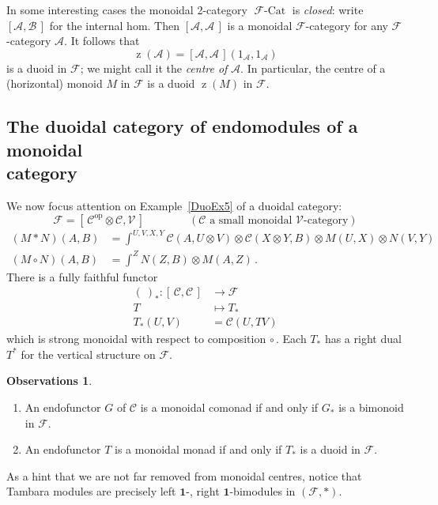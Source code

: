 \documentclass[a4paper,12pt]{article}
\theoremstyle{definition}
\newtheorem*{Observations}{Observations}%
\theoremstyle{fact}
\theoremstyle{genquest}
\theoremstyle{step}
\newcommand{\catI}{\mathbf{1}}
\newcommand{\catA}{\mathcal{A}}
\newcommand{\catB}{\mathcal{B}}
\newcommand{\catC}{\mathcal{C}}
\newcommand{\catF}{\mathcal{F}}
\newcommand{\FCat}{\operatorname{\mathcal{F}\mbox{-}Cat}}
\newcommand{\catV}{\mathcal{V}}
\newcommand{\op}{\operatorname{op}}
\newcommand{\zz}{\operatorname{z}}
\newcommand{\longto}{\longrightarrow}
\begin{document}
In some interesting cases the monoidal 2-category $\FCat$ is \emph{closed}: write $[\catA,\catB\,]$ for the internal hom.   
Then $[\catA,\catA\,]$ is a monoidal $\catF$-category for any $\catF$-category $\catA$.   
It follows that
\[
\zz(\catA) = [\catA,\catA\,] (1_\catA,1_\catA)
\]
is a duoid in $\catF$; we might call it the \emph{centre of} $\catA$.    
In particular, the centre of a (horizontal) monoid $M$ in $\catF$ is a duoid $\zz(M)$ in $\catF$. 


\subsection{The duoidal category of endomodules of a monoidal\\category}

We now focus attention on Example~\ref{DuoEx5} of a duoidal category:
\[
\catF = [\,\catC^{\op} \otimes \catC,\catV\,] \qquad \qquad (\catC \text{ a small monoidal } \catV\text{-category})
\]
\begin{align*}
 (M \ast N) (A,B) &= \int^{U,V,X,Y} \catC (A,U \otimes V) \otimes \catC (X \otimes Y,B) \otimes M (U,X) \otimes N (V,Y)
\\
 (M \circ N) (A,B) &= \int^Z N(Z,B) \otimes M (A,Z)\,.
\end{align*}
%
There is a fully faithful functor
\begin{align*}
(\ )_\ast : [\,\catC,\catC\,] &\longto \catF
\\T &\longmapsto  T_\ast
\\T_\ast (U,V) &= \catC (U,TV)
\end{align*}
which is strong monoidal with respect to composition $\circ\,$.   
Each $T_\ast$ has a right dual $T^\ast$ for the vertical structure on $\catF$. 

\begin{Observations}
\begin{enumerate}[1.]
\item %
An endofunctor $G$ of $\catC$ is a monoidal comonad if and only if $G_\ast$ is a bimonoid in $\catF$.
\item %
An endofunctor $T$ is a monoidal monad if and only if $T_\ast$ is a duoid in $\catF$. 
\end{enumerate}
\end{Observations}

As a hint that we are not far removed from monoidal centres, 
notice that Tambara modules are precisely left $\catI$-, right $\catI$-bimodules in $(\catF,\ast)$.
\end{document}
